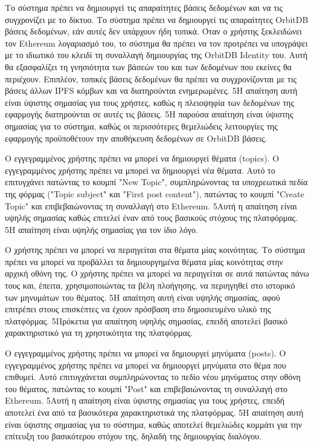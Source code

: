 \begin{enumerate}[label=\textbf{<ΛΑ-\arabic*>}, leftmargin=\parindent, align=left, labelwidth=\parindent, labelsep=0pt]
	\sysReqItem
		{\label{srs:functional-srs-create-user-databases}}
		{Το σύστημα πρέπει να δημιουργεί τις απαραίτητες βάσεις δεδομένων και να τις συγχρονίζει με το δίκτυο.}
		{Το σύστημα πρέπει να δημιουργεί τις απαραίτητες OrbitDB βάσεις δεδομένων, εάν αυτές δεν υπάρχουν ήδη τοπικά. Όταν ο χρήστης ξεκλειδώνει τον Ethereum λογαριασμό του, το σύστημα θα πρέπει να τον προτρέπει να υπογράψει με το ιδιωτικό του κλειδί τη συναλλαγή δημιουργίας της OrbitDB Identity του. Αυτή θα εξασφαλίζει τη γνησιότητα των βάσεών του και των δεδομένων που εκείνες θα περιέχουν. Επιπλέον, τοπικές βάσεις δεδομένων θα πρέπει να συγχρονίζονται με τις βάσεις άλλων IPFS κόμβων και να διατηρούνται ενημερωμένες.}
		{5}{Η απαίτηση αυτή είναι ύψιστης σημασίας για τους χρήστες, καθώς η πλειοψηφία των δεδομένων της εφαρμογής διατηρούνται σε αυτές τις βάσεις.}
		{5}{Η παρούσα απαίτηση είναι ύψιστης σημασίας για το σύστημα, καθώς οι περισσότερες θεμελιώδεις λειτουργίες της εφαρμογής προϋποθέτουν την αποθήκευση δεδομένων σε OrbitDB βάσεις.}

	\sysReqItem
		{\label{srs:functional-srs-create-topic}}
		{Ο εγγεγραμμένος χρήστης πρέπει να μπορεί να δημιουργεί θέματα (topics).}
		{Ο εγγεγραμμένος χρήστης πρέπει να μπορεί να δημιουργεί νέα θέματα. Αυτό το επιτυγχάνει πατώντας το κουμπί "New Topic", συμπληρώνοντας τα υποχρεωτικά πεδία της φόρμας ("Topic subject" και "First post content"), πατώντας το κουμπί "Create Topic" και επιβεβαιώνοντας τη συναλλαγή στο Ethereum.}
		{5}{Αυτή η απαίτηση είναι υψηλής σημασίας καθώς επιτελεί έναν από τους βασικούς στόχους της πλατφόρμας.}
		{5}{Η απαίτηση είναι υψηλής σημασίας για τον ίδιο λόγο.}

	\sysReqItem
		{\label{srs:functional-srs-browse-community-topics}}
		{Ο χρήστης πρέπει να μπορεί να περιηγείται στα θέματα μίας κοινότητας.}
		{Το σύστημα πρέπει να μπορεί να προβάλλει τα δημιουργημένα θέματα μίας κοινότητας στην αρχική οθόνη της. Ο χρήστης πρέπει να μπορεί να περιηγείται σε αυτά πατώντας πάνω τους και, έπειτα, χρησιμοποιώντας τα βέλη πλοήγησης, να περιηγηθεί στο ιστορικό των μηνυμάτων του θέματος.}
		{5}{Η απαίτηση αυτή είναι υψηλής σημασίας, αφού επιτρέπει στους επισκέπτες να έχουν πρόσβαση στο δημοσιευμένο υλικό της πλατφόρμας.}
		{5}{Πρόκετια για απαίτηση υψηλής σημασίας, επειδή αποτελεί βασικό χαρακτηριστικό για τη χρηστικότητα της πλατφόρμας.}

	\sysReqItem
		{\label{srs:functional-srs-create-post}}
		{Ο εγγεγραμμένος χρήστης πρέπει να μπορεί να δημιουργεί μηνύματα (posts).}
		{Ο εγγεγραμμένος χρήστης πρέπει να μπορεί να δημιουργεί μηνύματα στο θέμα που επιθυμεί. Αυτό επιτυγχάνεται συμπληρώνοντας το πεδίο νέου μηνύματος στην οθόνη του θέματος, πατώντας το κουμπί "Post" και επιβεβαιώνοντας τη συναλλαγή στο Ethereum.}
		{5}{Αυτή η απαίτηση είναι ύψιστης σημασίας για τους χρήστες, επειδή αποτελεί ένα από τα βασικότερα χαρακτηριστικά της πλατφόρμας.}
		{5}{Η απαίτηση αυτή είναι ύψιστης σημασίας για το σύστημα, καθώς αποτελεί θεμελιώδες κομμάτι για την επίτευξη του βασικότερου στόχου της, δηλαδή της δημιουργίας διαλόγου.}


\end{enumerate}
